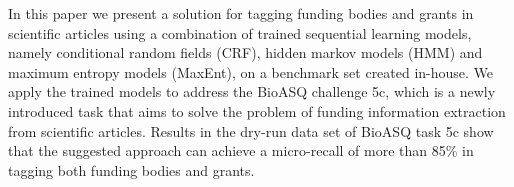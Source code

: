 In this paper we present a solution for tagging funding bodies and grants in scientific articles using a combination of trained sequential learning models, namely conditional random fields (CRF), hidden markov models (HMM) and maximum entropy models (MaxEnt), on a benchmark set created in-house. We apply the trained models to address the BioASQ challenge 5c, which is a newly introduced task that aims to solve the problem of funding information extraction from scientific articles. Results in the dry-run data set of BioASQ task 5c show that the suggested approach can achieve a micro-recall of more than 85\% in tagging both funding bodies and grants.

